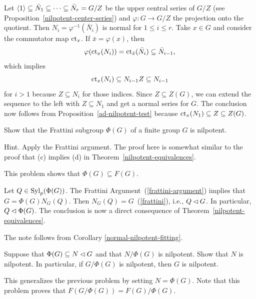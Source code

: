 \begin{solution} Let $\langle1\rangle\subseteq \bar N_1\subseteq\cdots\subseteq \bar N_r=G/Z$ be the upper central series of $G/Z$ (see Proposition~\ref{nilpotent-center-series}) and $\varphi\colon G\to G/Z$ the projection onto the quotient. Then $N_i=\varphi^{-1}(\bar N_i)$ is normal for $1\le i\le r$. Take $x\in G$ and consider the commutator map $\operatorname{\operatorname{ct}}_x$. If $\bar x=\varphi(x)$, then
$$
    \varphi(\operatorname{\operatorname{ct}}_x(N_i))=\operatorname{\operatorname{ct}}_{\bar x}(\bar N_i)\subseteq\bar N_{i-1},
$$
which implies
$$
    \operatorname{\operatorname{ct}}_x(N_i)\subseteq N_{i-1}Z\subseteq N_{i-1}
$$
for $i>1$ because $Z\subseteq N_i$ for those indices. Since $Z\subseteq Z(G)$, we can extend the sequence to the left with $Z\subseteq N_1$ and get a normal series for $G$. The conclusion now follows from Proposition~\ref{ad-nilpotent-test} because $\operatorname{\operatorname{ct}}_x(N_1)\subseteq Z\subseteq Z(G)$.  \end{solution}

\begin{probl}
    Show that the Frattini subgroup\/ $\Phi(G)$ of a finite group\/ $G$ is nilpotent.

    \textrm{\upshape Hint. Apply the Frattini argument. The proof here is somewhat similar to the proof that (c) implies (d) in Theorem~\ref{nilpotent-equivalences}}.
    
    \textrm{ This problem shows that $\Phi(G) \subseteq F(G)$.}
\end{probl}

\begin{solution} Let $Q\in{\rm Syl}_p(\Phi(G))$. The Frattini Argument~(\ref{frattini-argument}) implies that $G=\Phi(G)N_G(Q)$. Then $N_G(Q)=G$~(\ref{frattini}), i.e., $Q\lhd G$. In particular, $Q\lhd\Phi(G)$. The conclusion is now a direct consequence of Theorem~\ref{nilpotent-equivalences}.

The note follows from Corollary \ref{normal-nilpotent-fitting}.  \end{solution}

\begin{probl}\label{problem-1.D.15}
    Suppose that\/ $\Phi(G)\subseteq N\lhd G$ and that\/ $N/\Phi(G)$ is nilpotent. Show that\/ $N$ is nilpotent. In particular, if\/ $G/\Phi(G)$ is nilpotent, then\/ $G$ is nilpotent.

    \textrm{ This generalizes the previous problem by setting $N = \Phi(G)$. Note that this problem proves that $F(G/\Phi(G)) = F(G)/\Phi(G)$.}
\end{probl}

